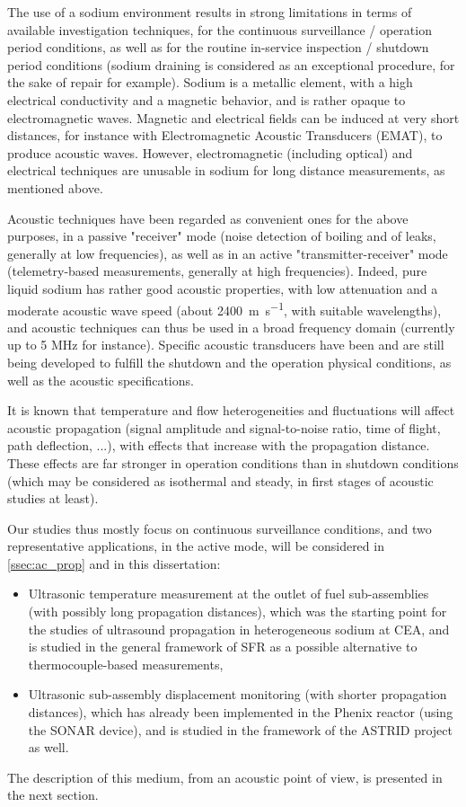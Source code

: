     The use of a sodium environment results in strong limitations in terms of available investigation techniques,
for the continuous surveillance / operation period conditions, as well as for the routine in-service inspection / shutdown period conditions (sodium draining is considered as an exceptional procedure, for the sake of repair for example).
    Sodium is a metallic element, with a high electrical conductivity and a magnetic behavior, and is rather opaque to electromagnetic waves.
    Magnetic and electrical fields can be induced at very short distances, for instance with Electromagnetic Acoustic Transducers (EMAT), to produce acoustic waves.
However, electromagnetic (including optical) and electrical techniques are unusable in sodium for long distance measurements, as mentioned above.

    Acoustic techniques have been regarded as convenient ones for the above purposes, in a passive "receiver" mode (noise detection of boiling and of leaks, generally at low frequencies), as well as in an active "transmitter-receiver" mode (telemetry-based measurements, generally at high frequencies).
Indeed, pure liquid sodium has rather good acoustic properties, with low attenuation and a moderate acoustic wave speed (about \SI{2400}{\meter\per\second}, with suitable wavelengths),
and acoustic techniques can thus be used in a broad frequency domain (currently up to 5 MHz for instance).
    Specific acoustic transducers have been and are still being developed to fulfill the shutdown and the operation physical conditions, as well as the acoustic specifications.

    It is known that temperature and flow heterogeneities and fluctuations will affect acoustic propagation (signal amplitude and signal-to-noise ratio, time of flight, path deflection, ...), with effects that increase with the propagation distance. These effects are far stronger in operation conditions than in shutdown conditions (which may be considered as isothermal and steady, in first stages of acoustic studies at least).

Our studies thus mostly focus on continuous surveillance conditions, and two representative applications, in the active mode, will be considered in \autoref{ssec:ac_prop} and in this dissertation:
    \begin{itemize}
    \item Ultrasonic temperature measurement at the outlet of fuel sub-assemblies (with possibly long propagation distances), which was the starting point for the studies of ultrasound propagation in heterogeneous sodium at CEA, and is studied in the general framework of SFR as a possible alternative to thermocouple-based measurements,
    \item Ultrasonic sub-assembly displacement monitoring (with shorter propagation distances), which has already been implemented in the Phenix reactor (using the SONAR device), and is studied in the framework of the ASTRID project as well.
    \end{itemize}
The description of this medium, from an acoustic point of view, is presented in the next section.

